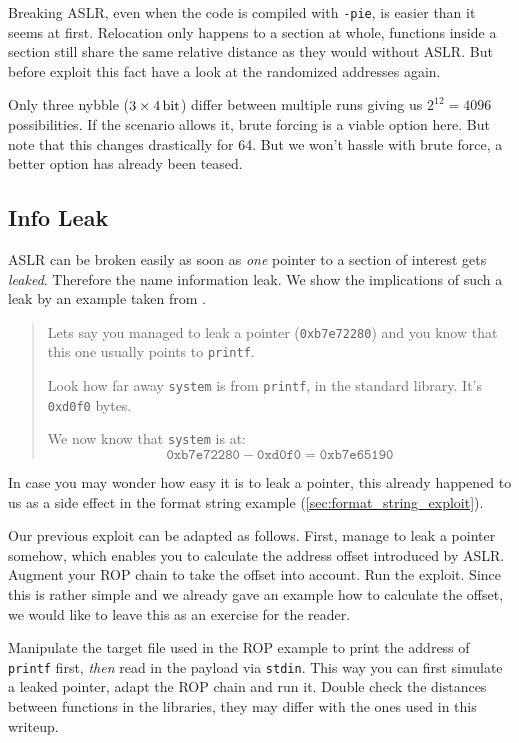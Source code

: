 \documentclass[article]{uibk}
\begin{document}
Breaking ASLR, even when the code is compiled with \texttt{-pie}, is easier
than it seems at first. Relocation only happens to a section at whole,
functions inside a section still share the same relative distance as they would
without ASLR. But before exploit this fact have a look at the randomized
addresses again.

Only three nybble ($3 \times \SI{4}{\bit}$) differ between multiple runs giving
us $2^{12} = 4096$ possibilities. If the scenario allows it, brute forcing is a
viable option here. But note that this changes drastically for \SI{64}{\bit}.
But we won't hassle with brute force, a better option has already been teased.

\subsection{Info Leak}
\label{sub:info_leak}

ASLR can be broken easily as soon as \emph{one} pointer to a section of
interest gets \emph{leaked}. Therefore the name information leak. We show the
implications of such a leak by an example taken from \cite{rpisec}.

\begin{quote}
    Lets say you managed to leak a pointer (\texttt{0xb7e72280}) and you know
    that this one usually points to \texttt{printf}.
    \medskip

    Look how far away \texttt{system} is from \texttt{printf}, in the standard
    library. It's \texttt{0xd0f0} bytes.
    \medskip

    We now know that \texttt{system} is at:
    \[ \mathtt{0xb7e72280} - \mathtt{0xd0f0} = \mathtt{0xb7e65190} \]
\end{quote}

In case you may wonder how easy it is to leak a pointer, this already happened
to us as a side effect in the format string example
(\cref{sec:format_string_exploit}).

Our previous exploit can be adapted as follows. First, manage to leak a pointer
somehow, which enables you to calculate the address offset introduced by ASLR.
Augment your ROP chain to take the offset into account. Run the exploit. Since
this is rather simple and we already gave an example how to calculate the
offset, we would like to leave this as an exercise for the reader.

Manipulate the target file used in the ROP example to print the address of
\texttt{printf} first, \emph{then} read in the payload via \texttt{stdin}. This
way you can first simulate a leaked pointer, adapt the ROP chain and run it.
Double check the distances between functions in the libraries, they may differ
with the ones used in this writeup.
\end{document}
